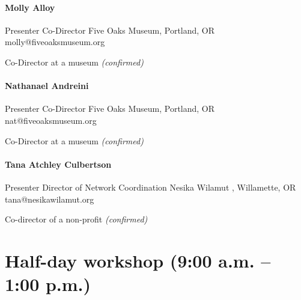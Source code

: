 \documentclass{report}
\begin{document}
              
                \subsubsection*{ Molly  Alloy  }
                Presenter\newline
                Co-Director\newline
                Five Oaks Museum, Portland, OR
                \newline
                molly@fiveoaksmuseum.org\newline
                
                

                Co-Director at a museum
                \emph{ (confirmed) }
              

              
                \subsubsection*{ Nathanael Andreini }
                Presenter\newline
                Co-Director\newline
                Five Oaks Museum, Portland, OR
                \newline
                nat@fiveoaksmuseum.org\newline
                
                

                Co-Director at a museum
                \emph{ (confirmed) }
              

              
                \subsubsection*{ Tana  Atchley Culbertson }
                Presenter\newline
                Director of Network Coordination\newline
                Nesika Wilamut , Willamette, OR
                \newline
                tana@nesikawilamut.org\newline
                
                

                Co-director of a non-profit
                \emph{ (confirmed) }
              
    \newpage
    \chapter*{ Half-day workshop (9:00 a.m. – 1:00 p.m.) }
\end{document}
